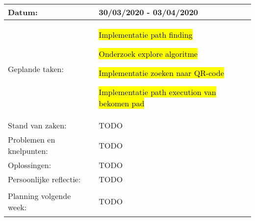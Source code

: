 \begin{tabularx}{\textwidth}{| l | X |}
    \hline
    Datum: & 30/03/2020 - 03/04/2020\\
    \hline
    Geplande taken: &
    \begin{compactitem}
      \item \hl{Implementatie path finding}
      \item \hl{Onderzoek explore algoritme}
      \item \hl{Implementatie zoeken naar QR-code}
      \item \hl{Implementatie path execution van bekomen pad}
    \end{compactitem}\\
    \hline
    Stand van zaken: & TODO\\
    \hline
    Problemen en knelpunten: & TODO\\
    \hline
    Oplossingen: & TODO\\
    \hline
    Persoonlijke reflectie: & TODO\\
    \hline
    Planning volgende week: &
    \begin{compactitem}
      \item TODO
    \end{compactitem}\\
    \hline
  \end{tabularx}